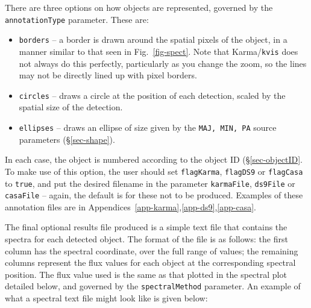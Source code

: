There are three options on how objects are represented, governed by the
\texttt{annotationType} parameter. These are:
\begin{itemize}
\item \texttt{borders} -- a border is drawn around the spatial pixels
  of the object, in a manner similar to that seen in
  Fig.~\ref{fig-spect}. Note that Karma/\texttt{kvis} does not always
  do this perfectly, particularly as you change the zoom, so the lines
  may not be directly lined up with pixel borders.
\item \texttt{circles} -- draws a circle at the position of each
  detection, scaled by the spatial size of the detection.
\item \texttt{ellipses} -- draws an ellipse of size given by the
  \texttt{MAJ, MIN, PA} source parameters (\S\ref{sec-shape}).
\end{itemize}
In each case, the object is numbered according to the object ID
(\S\ref{sec-objectID}. To make use of this option, the user should set
\texttt{flagKarma}, \texttt{flagDS9} or \texttt{flagCasa} to
\texttt{true}, and put the desired filename in the parameter
\texttt{karmaFile}, \texttt{ds9File} or \texttt{casaFile} -- again,
the default is for these not to be produced. Examples of these
annotation files are in
Appendices~\ref{app-karma},\ref{app-ds9},\ref{app-casa}. 

\label{sec-spectraltext}

The final optional results file produced is a simple text file that
contains the spectra for each detected object. The format of the file
is as follows: the first column has the spectral coordinate, over the
full range of values; the remaining columns represent the flux values
for each object at the corresponding spectral position. The flux value
used is the same as that plotted in the spectral plot detailed below,
and governed by the \texttt{spectralMethod} parameter. An example of
what a spectral text file might look like is given below:

